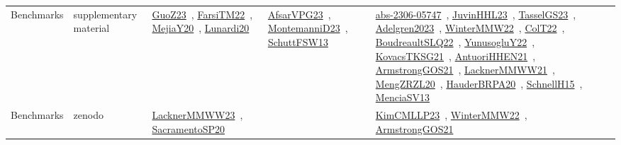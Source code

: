 {\begin{longtable}{lp{3cm}>{\raggedright\arraybackslash}p{6cm}>{\raggedright\arraybackslash}p{6cm}>{\raggedright\arraybackslash}p{8cm}}
Benchmarks & supplementary material & \href{../works/GuoZ23.pdf}{GuoZ23}~\cite{GuoZ23}, \href{../works/FarsiTM22.pdf}{FarsiTM22}~\cite{FarsiTM22}, \href{../works/MejiaY20.pdf}{MejiaY20}~\cite{MejiaY20}, \href{../works/Lunardi20.pdf}{Lunardi20}~\cite{Lunardi20} & \href{../works/AfsarVPG23.pdf}{AfsarVPG23}~\cite{AfsarVPG23}, \href{../works/MontemanniD23.pdf}{MontemanniD23}~\cite{MontemanniD23}, \href{../works/SchuttFSW13.pdf}{SchuttFSW13}~\cite{SchuttFSW13} & \href{../works/abs-2306-05747.pdf}{abs-2306-05747}~\cite{abs-2306-05747}, \href{../works/JuvinHHL23.pdf}{JuvinHHL23}~\cite{JuvinHHL23}, \href{../works/TasselGS23.pdf}{TasselGS23}~\cite{TasselGS23}, \href{../works/Adelgren2023.pdf}{Adelgren2023}~\cite{Adelgren2023}, \href{../works/WinterMMW22.pdf}{WinterMMW22}~\cite{WinterMMW22}, \href{../works/ColT22.pdf}{ColT22}~\cite{ColT22}, \href{../works/BoudreaultSLQ22.pdf}{BoudreaultSLQ22}~\cite{BoudreaultSLQ22}, \href{../works/YunusogluY22.pdf}{YunusogluY22}~\cite{YunusogluY22}, \href{../works/KovacsTKSG21.pdf}{KovacsTKSG21}~\cite{KovacsTKSG21}, \href{../works/AntuoriHHEN21.pdf}{AntuoriHHEN21}~\cite{AntuoriHHEN21}, \href{../works/ArmstrongGOS21.pdf}{ArmstrongGOS21}~\cite{ArmstrongGOS21}, \href{../works/LacknerMMWW21.pdf}{LacknerMMWW21}~\cite{LacknerMMWW21}, \href{../works/MengZRZL20.pdf}{MengZRZL20}~\cite{MengZRZL20}, \href{../works/HauderBRPA20.pdf}{HauderBRPA20}~\cite{HauderBRPA20}, \href{../works/SchnellH15.pdf}{SchnellH15}~\cite{SchnellH15}, \href{../works/MenciaSV13.pdf}{MenciaSV13}~\cite{MenciaSV13}\\
Benchmarks & zenodo & \href{../works/LacknerMMWW23.pdf}{LacknerMMWW23}~\cite{LacknerMMWW23}, \href{../works/SacramentoSP20.pdf}{SacramentoSP20}~\cite{SacramentoSP20} &  & \href{../works/KimCMLLP23.pdf}{KimCMLLP23}~\cite{KimCMLLP23}, \href{../works/WinterMMW22.pdf}{WinterMMW22}~\cite{WinterMMW22}, \href{../works/ArmstrongGOS21.pdf}{ArmstrongGOS21}~\cite{ArmstrongGOS21}\\
\end{longtable}
}

